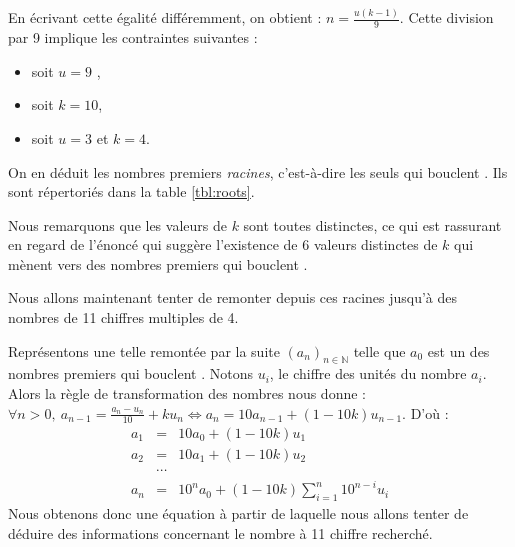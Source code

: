 \documentclass[10pt,a4paper]{article}
\begin{document}
En écrivant cette égalité différemment, on obtient : $n = \frac{u(k - 1)}9$.
Cette division par 9 implique les contraintes suivantes :
\begin{itemize}
\item soit $u=9$ ,
\item soit $k=10$,
\item soit $u=3$ et $k=4$.
\end{itemize}

\begin{table}[!ht]
\caption{Les nombres premiers racines\label{tbl:roots}}
\end{table}

On en déduit les nombres premiers \emph{racines}, c'est-à-dire les seuls qui \og bouclent \fg. Ils sont répertoriés dans la table \ref{tbl:roots}.

Nous remarquons que les valeurs de $k$ sont toutes distinctes, ce qui est rassurant en regard de l'énoncé qui suggère l'existence de 6 valeurs distinctes de $k$ qui mènent vers des nombres premiers qui \og bouclent \fg.

Nous allons maintenant tenter de remonter depuis ces racines jusqu'à des nombres de 11 chiffres multiples de 4.

Représentons une telle remontée par la suite $(a_n)_{n\in\mathbb{N}}$ telle que $a_0$ est un des nombres premiers qui \og bouclent \fg. Notons $u_i$, le chiffre des unités du nombre $a_i$. Alors la règle de transformation des nombres nous donne :
$\forall n > 0, \: a_{n-1} = \frac{a_n - u_n}{10} + k u_n \iff 
a_n = 10a_{n-1} + (1 - 10k)u_{n-1}$. D'où :
$$
\begin{array}{ccl}
a_1 &=& 10a_0 + (1 - 10k)u_1 \\
a_2 &=& 10a_1 + (1 - 10k)u_2 \\
&\cdots & \\
a_n &=& 10^n a_0 + (1 - 10k) \sum_{i=1}^n 10^{n-i}u_i
\end{array}
$$
Nous obtenons donc une équation à partir de laquelle nous allons tenter de déduire des informations concernant le nombre à 11 chiffre recherché.
\end{document}
